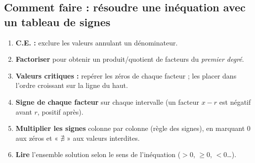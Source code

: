 \documentclass[11pt,a4paper]{article}
\begin{document}
\subsection{Comment faire : résoudre une inéquation avec un tableau de signes}

\begin{commentfaire}
\begin{enumerate}[leftmargin=2em,topsep=2pt,itemsep=2pt]
  \item \textbf{C.E. :} exclure les valeurs annulant un dénominateur.
  \item \textbf{Factoriser} pour obtenir un produit/quotient de facteurs du \emph{premier degré}.
  \item \textbf{Valeurs critiques :} repérer les zéros de chaque facteur ; les placer dans l'ordre croissant sur la ligne du haut.
  \item \textbf{Signe de chaque facteur} sur chaque intervalle (un facteur $x-r$ est négatif avant $r$, positif après).
  \item \textbf{Multiplier les signes} colonne par colonne (règle des signes), en marquant $0$ aux zéros et « $\nexists$ » aux valeurs interdites.
  \item \textbf{Lire} l'ensemble solution selon le sens de l'inéquation ($>0$, $\geq 0$, $<0$\dots).
\end{enumerate}
\end{commentfaire}
\end{document}

